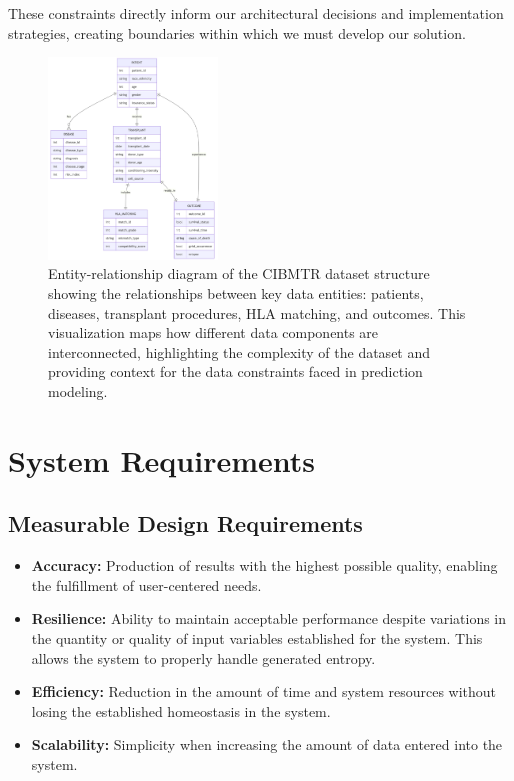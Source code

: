 These constraints directly inform our architectural decisions and implementation strategies, creating boundaries within which we must develop our solution.

\begin{figure}[H]
    \centering
    \includegraphics[width=0.4\textwidth]{figures/DataEntityRelationship.png}
    \caption{Entity-relationship diagram of the CIBMTR dataset structure showing the relationships between key data entities: patients, diseases, transplant procedures, HLA matching, and outcomes. This visualization maps how different data components are interconnected, highlighting the complexity of the dataset and providing context for the data constraints faced in prediction modeling.}
    \label{fig:data_er_diagram}
\end{figure}

\section{System Requirements}

\subsection{Measurable Design Requirements}

\begin{itemize}
    \item \textbf{Accuracy:} Production of results with the highest possible quality, enabling the fulfillment of user-centered needs.
    
    \item \textbf{Resilience:} Ability to maintain acceptable performance despite variations in the quantity or quality of input variables established for the system. This allows the system to properly handle generated entropy.
    
    \item \textbf{Efficiency:} Reduction in the amount of time and system resources without losing the established homeostasis in the system.
    
    \item \textbf{Scalability:} Simplicity when increasing the amount of data entered into the system.
\end{itemize}

